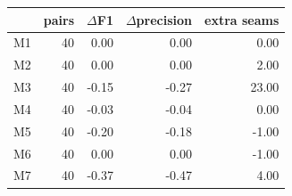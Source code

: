 \begin{tabular}{lrrrr}
\toprule
 & pairs & $\Delta$F1 & $\Delta$precision & extra seams \\
\midrule
M1 & 40 & 0.00 & 0.00 & 0.00 \\
M2 & 40 & 0.00 & 0.00 & 2.00 \\
M3 & 40 & -0.15 & -0.27 & 23.00 \\
M4 & 40 & -0.03 & -0.04 & 0.00 \\
M5 & 40 & -0.20 & -0.18 & -1.00 \\
M6 & 40 & 0.00 & 0.00 & -1.00 \\
M7 & 40 & -0.37 & -0.47 & 4.00 \\
\bottomrule
\end{tabular}
